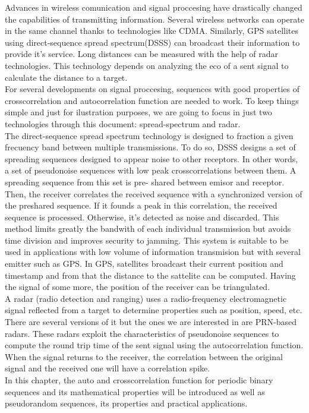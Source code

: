Advances in wireless comunication and signal proccesing have drastically
changed the capabilities of transmitting information. Several wireless
networks can operate in the same channel thanks to technologies like
CDMA. Similarly, GPS\cite{GPS} satellites using direct-sequence spread
spectrum(DSSS) can broadcast their information to provide it's service. Long
distances can be measured with the help of radar technologies. This
technology depends on analyzing the eco of a sent signal to calculate the
distance to a target.\\

For several developments on signal proccesing, sequences with good properties
of crosscorrelation and autocorrelation function are needed to work. To keep
things simple and just for ilustration purposes, we are going to focus in just
two technologies through this document: spread-spectrum and radar.\\

The direct-sequence spread spectrum technology\cite{DSSS_1}\cite{DSSS} is
designed to fraction a given frecuency band between multiple transmissions. To
do so, DSSS designs a set of spreading sequences designed to appear noise to
other receptors. In other words, a set of pseudonoise sequences with low peak
crosscorrelations between them. A spreading sequence from this set is pre-
shared between emisor and receptor. Then, the receiver correlates the received
sequence with a synchronized version of the preshared sequence. If it founds a
peak in this correlation, the received sequence is processed. Otherwise, it's
detected as noise and discarded. This method limits greatly the bandwith of
each individual transmission but avoids time division and improves security to
jamming. This system is suitable to be used in applications with low volume
of information transmision but with several emitter such as GPS. In GPS,
satellites broadcast their current position and timestamp and from that
the distance to the sattelite can be computed. Having the signal of some more,
the position of the receiver can be triangulated.\\

A radar (radio detection and ranging) uses a radio-frequency electromagnetic
signal reflected from a target to determine properties such as position, speed,
etc. There are several versions of it but the ones we are interested in are
PRN-based radars\cite{prn_radar_example1}\cite{prn_radar_example2}. These
radars exploit the characteristics of pseudonoise sequences to compute the
round trip time of the sent signal using the autocorrelation function. When
the signal returns to the receiver, the correlation between the original
signal and the received one will have a correlation spike.\\

In this chapter, the auto and crosscorrelation function for
periodic binary sequences and its mathematical properties will be introduced
as well as pseudorandom sequences, its properties and practical applications.

 
